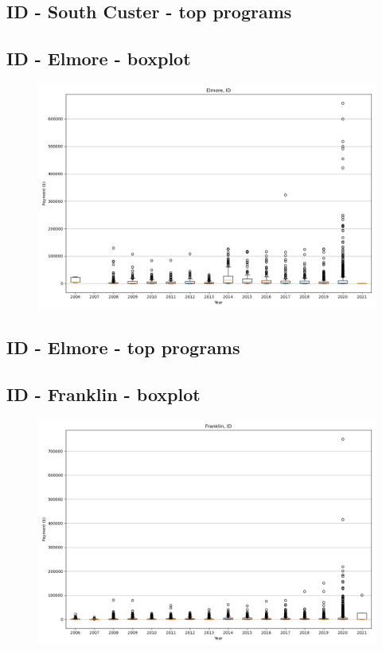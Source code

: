 \subsection*{ID - South Custer - top programs}

\newpage
\subsection*{ID - Elmore - boxplot}
\begin{figure}[h]
\centering
\includegraphics[width=7in]{../output/boxplots/counties/Elmore-ID_boxplot.png}
\end{figure}


\subsection*{ID - Elmore - top programs}

\newpage
\subsection*{ID - Franklin - boxplot}
\begin{figure}[h]
\centering
\includegraphics[width=7in]{../output/boxplots/counties/Franklin-ID_boxplot.png}
\end{figure}


